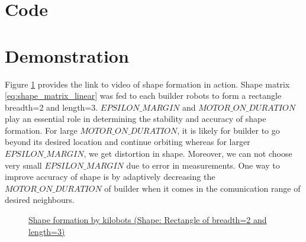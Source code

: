 \documentclass{report}[12pt]
\begin{document}
\section{Code}



\section{Demonstration}
Figure \ref{fig:shape_formation_demo} provides the link to video of shape formation in action. Shape matrix \eqref{eq:shape_matrix_linear} was fed to each builder robots to form a rectangle  breadth=2 and length=3. $EPSILON\_MARGIN$ and $MOTOR\_ON\_DURATION$ play an essential role in determining the stability and accuracy of shape formation. For large $MOTOR\_ON\_DURATION$, it is likely for builder to go beyond its desired location and continue orbiting whereas for larger $EPSILON\_MARGIN$, we get distortion in shape. Moreover, we can not choose very small $EPSILON\_MARGIN$ due to error in measurements. One way to improve accuracy of shape is by adaptively decreasing the $MOTOR\_ON\_DURATION$ of builder when it comes in the comunication range of desired neighbours.
\begin{figure}[H]
	\centering
	\caption{\href{https://youtu.be/SoDq9GQvNAE}{Shape formation by kilobots (Shape: Rectangle of breadth=2 and length=3)}}
	\label{fig:shape_formation_demo}
\end{figure}
\end{document}
